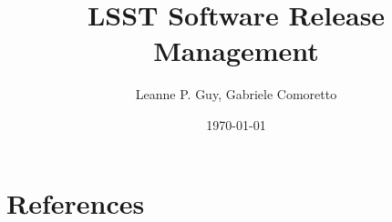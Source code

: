 \documentclass[DM,lsstdraft,toc]{lsstdoc}
\title{LSST Software Release Management}
\author{%
Leanne P. Guy, Gabriele Comoretto
}
\date{\today}
\begin{document}
\maketitle



\newpage


\newpage


\appendix




\section{References} \label{sec:bib}


\printglossaries
\end{document}
